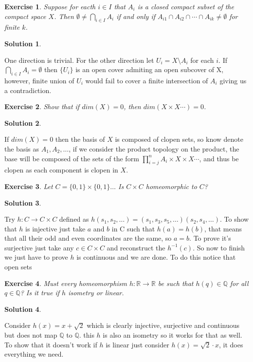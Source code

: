 \documentclass[11pt,a4paper]{article}
\newtheorem{Ex}{Exercise}
\newtheorem{Sol}{Solution}
\newcommand{\R}{\mathbb{R}}
\newcommand{\ra}{\rightarrow}
\begin{document}
\begin{Ex}
	Suppose for eacth $i\in I$ that $A_i$ is a closed compact subset of the compact space $X$. Then $\emptyset \neq \bigcap_{i \in I}A_i$ if and only if $A_{i1} \cap A_{i2} \cap \cdots \cap A_{ik} \neq \emptyset$ for finite $k$.
\end{Ex}
\begin{Sol}
\end{Sol}
\noindent One direction is trivial. For the other direction let $U_i = X \setminus A_i$ for each $i$. If $\bigcap_{i \in I}A_i = \emptyset$ then $\{U_i\}$ is an open cover admiting an open subcover  of X, however,  finite union of $U_i$ would fail to cover a finite intersection of $A_i$ giving us a contradiction.

\begin{Ex}
	Show that if $dim(X) = 0$, then $dim(X \times X \cdots) = 0$.
\end{Ex}

\begin{Sol}\end{Sol}
\noindent If $dim(X)=0$ then the basis of $X$ is composed of clopen sets, so know denote the basis as $A_1,A_2,\dots$, if we consider the product topology on the product, the base will be composed of the sets of the form $\prod_{i=j}^{n}A_i \times X \times X \cdots$, and thus be clopen as each component is clopen in $X$.

\begin{Ex}
	Let $C = \{0,1\} \times \{0,1\} \dots$ Is $C\times C$ homeomorphic to $C$? 
\end{Ex}

\begin{Sol}\end{Sol}
Try $h: C \ra C \times C$ defined as $h(s_1,s_2,\dots) = (s_1,s_3,s_5,\dots)(s_2,s_4,\dots)$. To show that $h$ is injective just take $a$ and $b$ in C such that $h(a) = h(b)$, that means that all their odd and even coordinates are the same, so $a = b$. To prove it's surjective just take any $c \in C \times C$ and reconstruct the $h^{-1}(c)$. So now to finish we just have to prove $h$ is continuous and we are done. To do this notice that open sets 


\begin{Ex}
	Must every homeomorphism $h: \R \ra \R$ be such that $h(q) \in \mathbb{Q}$ for all $q \in \mathbb{Q}$? Is it true if $h$ isometry or linear.
\end{Ex}

\begin{Sol}\end{Sol}
\noindent Consider $h(x) = x +\sqrt{2}$ which is clearly injective, surjective and continuous but does not map $\mathbb{Q}$ to $\mathbb{Q}$. this $h$ is also an isometry so it works for that as well. To show that it doesn't work if $h$ is linear just consider $h(x) = \sqrt{2} \cdot x$, it does everything we need.
\end{document}
